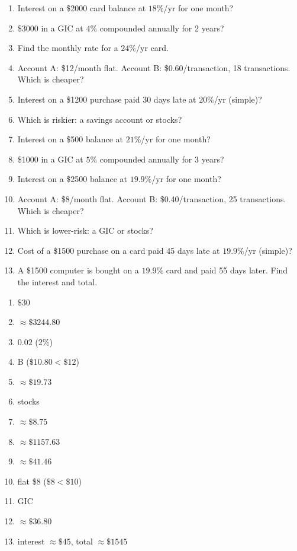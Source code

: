 \documentclass[11pt]{article}
\begin{document}
\begin{recapbox}
\begin{multicols}{2}
\small
\begin{enumerate}[leftmargin=*,itemsep=3pt]
  \item Interest on a \$2000 card balance at $18\%$/yr for one month?
  \item \$3000 in a GIC at $4\%$ compounded annually for 2 years?
  \item Find the monthly rate for a $24\%$/yr card.
  \item Account A: \$12/month flat. Account B: \$0.60/transaction, 18 transactions. Which is cheaper?
  \item Interest on a \$1200 purchase paid 30 days late at $20\%$/yr (simple)?
  \item Which is riskier: a savings account or stocks?
  \item Interest on a \$500 balance at $21\%$/yr for one month?
  \item \$1000 in a GIC at $5\%$ compounded annually for 3 years?
  \item Interest on a \$2500 balance at $19.9\%$/yr for one month?
  \item Account A: \$8/month flat. Account B: \$0.40/transaction, 25 transactions. Which is cheaper?
  \item Which is lower-risk: a GIC or stocks?
  \item Cost of a \$1500 purchase on a card paid 45 days late at $19.9\%$/yr (simple)?
  \item A \$1500 computer is bought on a $19.9\%$ card and paid 55 days later. Find the interest and total.
\end{enumerate}
\end{multicols}
\end{recapbox}

\begin{keybox}
\begin{multicols}{2}
\small
\begin{enumerate}[leftmargin=*,itemsep=3pt]
  \item $\$30$
  \item $\approx\$3244.80$
  \item $0.02$ (2\%)
  \item B ($\$10.80<\$12$)
  \item $\approx\$19.73$
  \item stocks
  \item $\approx\$8.75$
  \item $\approx\$1157.63$
  \item $\approx\$41.46$
  \item flat \$8 ($\$8<\$10$)
  \item GIC
  \item $\approx\$36.80$
  \item interest $\approx\$45$, total $\approx\$1545$
\end{enumerate}
\end{multicols}
\end{keybox}
\end{document}
